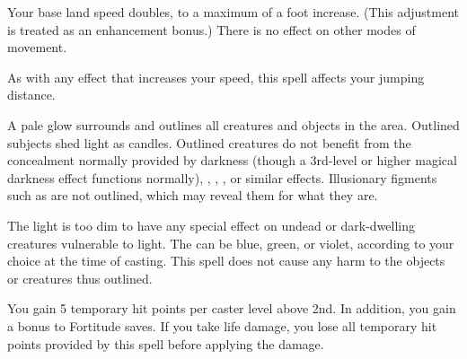 \spellrng{\rngclose}
\begin{spelleffect}
  Your base land speed doubles, to a maximum of a  foot increase. (This adjustment is treated as an enhancement bonus.) There is no effect on other modes of movement.
\end{spelleffect}
\begin{spellnotes}
 As with any effect that increases your speed, this spell affects your jumping distance.
 \end{spellnotes}

\begin{comment}
\subsubsection{F}
\end{comment}

\spellrng{\rngmed}
\begin{spelleffect}
  A pale glow surrounds and outlines all creatures and objects in the area. Outlined subjects shed light as candles. Outlined creatures do not benefit from the concealment normally provided by darkness (though a 3rd-level or higher magical darkness effect functions normally), , , , or similar effects. Illusionary figments such as  are not outlined, which may reveal them for what they are.
  
  The light is too dim to have any special effect on undead or dark-dwelling creatures vulnerable to light. The  can be blue, green, or violet, according to your choice at the time of casting. This spell does not cause any harm to the objects or creatures thus outlined.
\end{spelleffect}

\spellrng{\rngpers}
\spelldur{\durshort}
\begin{spelleffect}
  You gain 5 temporary hit points  per caster level above 2nd. In addition, you gain a  bonus to Fortitude saves. \bonusscalingdescription If you take life damage, you lose all temporary hit points provided by this spell before applying the damage.
\end{spelleffect}

